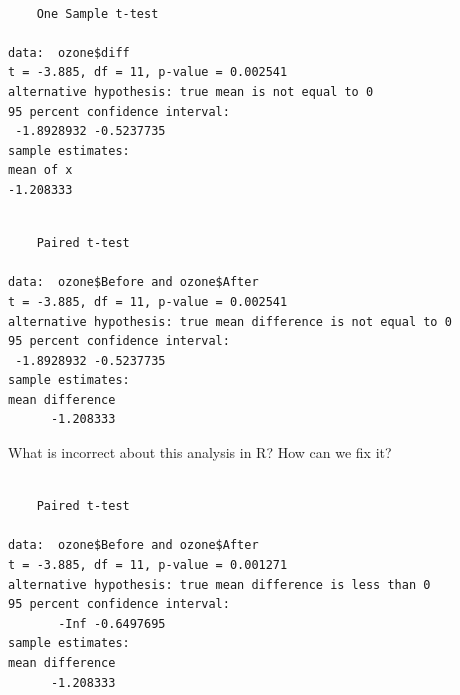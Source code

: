 \documentclass[
  letterpaper,
  DIV=11,
  numbers=noendperiod]{scrartcl}
\newenvironment{Shaded}{\begin{snugshade}}{\end{snugshade}}
\newcommand{\AttributeTok}[1]{\textcolor[rgb]{0.40,0.45,0.13}{#1}}
\newcommand{\ConstantTok}[1]{\textcolor[rgb]{0.56,0.35,0.01}{#1}}
\newcommand{\FunctionTok}[1]{\textcolor[rgb]{0.28,0.35,0.67}{#1}}
\newcommand{\NormalTok}[1]{\textcolor[rgb]{0.00,0.23,0.31}{#1}}
\newcommand{\SpecialCharTok}[1]{\textcolor[rgb]{0.37,0.37,0.37}{#1}}
\newcommand{\StringTok}[1]{\textcolor[rgb]{0.13,0.47,0.30}{#1}}
\begin{document}
\begin{verbatim}

    One Sample t-test

data:  ozone$diff
t = -3.885, df = 11, p-value = 0.002541
alternative hypothesis: true mean is not equal to 0
95 percent confidence interval:
 -1.8928932 -0.5237735
sample estimates:
mean of x 
-1.208333 
\end{verbatim}

\newpage

\begin{Shaded}
\end{Shaded}

\begin{verbatim}

    Paired t-test

data:  ozone$Before and ozone$After
t = -3.885, df = 11, p-value = 0.002541
alternative hypothesis: true mean difference is not equal to 0
95 percent confidence interval:
 -1.8928932 -0.5237735
sample estimates:
mean difference 
      -1.208333 
\end{verbatim}

What is incorrect about this analysis in R? How can we fix it?

\hfill\break
\hfill\break
\hfill\break
\hfill\break

\begin{Shaded}
\end{Shaded}

\begin{verbatim}

    Paired t-test

data:  ozone$Before and ozone$After
t = -3.885, df = 11, p-value = 0.001271
alternative hypothesis: true mean difference is less than 0
95 percent confidence interval:
       -Inf -0.6497695
sample estimates:
mean difference 
      -1.208333 
\end{verbatim}
\end{document}
